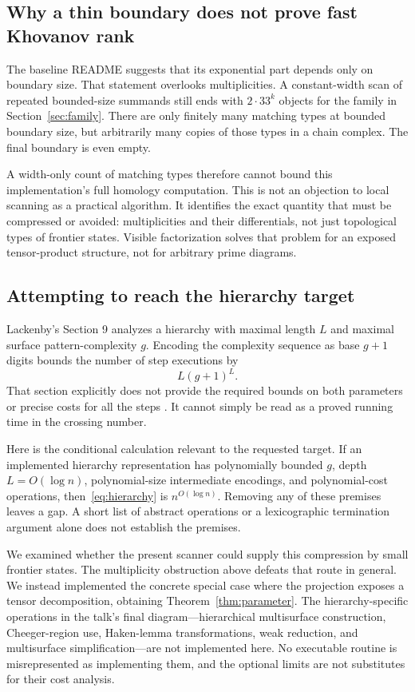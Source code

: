 \documentclass[11pt]{article}
\theoremstyle{definition}\newtheorem{definition}[theorem]{Definition}
\theoremstyle{remark}\newtheorem{remark}[theorem]{Remark}
\begin{document}
\subsection{Why a thin boundary does not prove fast Khovanov rank}

The baseline README suggests that its exponential part depends only on
boundary size. That statement overlooks multiplicities. A constant-width
scan of repeated bounded-size summands still ends with $2\cdot33^k$
objects for the family in Section~\ref{sec:family}. There are only finitely
many matching types at bounded boundary size, but arbitrarily many copies
of those types in a chain complex. The final boundary is even empty.

A width-only count of matching types therefore cannot bound this
implementation's full homology computation. This is not an objection to
local scanning as a practical algorithm. It identifies the exact quantity
that must be compressed or avoided: multiplicities and their differentials,
not just topological types of frontier states. Visible factorization solves
that problem for an exposed tensor-product structure, not for arbitrary
prime diagrams.

\subsection{Attempting to reach the hierarchy target}
\label{sec:target}

Lackenby's Section 9 analyzes a hierarchy with maximal length $L$ and maximal
surface pattern-complexity $g$. Encoding the complexity sequence as base
$g+1$ digits bounds the number of step executions by
\begin{equation}\label{eq:hierarchy}
 L(g+1)^L.
\end{equation}
That section explicitly does not provide the required bounds on both
parameters or precise costs for all the steps \cite{L2026}. It cannot simply
be read as a proved running time in the crossing number.

Here is the conditional calculation relevant to the requested target. If an
implemented hierarchy representation has polynomially bounded $g$, depth
$L=O(\log n)$, polynomial-size intermediate encodings, and polynomial-cost
operations, then~\eqref{eq:hierarchy} is $n^{O(\log n)}$. Removing any of these
premises leaves a gap. A short list of abstract operations or a lexicographic
termination argument alone does not establish the premises.

We examined whether the present scanner could supply this compression by
small frontier states. The multiplicity obstruction above defeats that route
in general. We instead implemented the concrete special case where the
projection exposes a tensor decomposition, obtaining
Theorem~\ref{thm:parameter}. The hierarchy-specific operations in the talk's
final diagram---hierarchical multisurface construction, Cheeger-region use,
Haken-lemma transformations, weak reduction, and multisurface
simplification---are not implemented here. No executable routine is
misrepresented as implementing them, and the optional limits are not
substitutes for their cost analysis.
\end{document}
